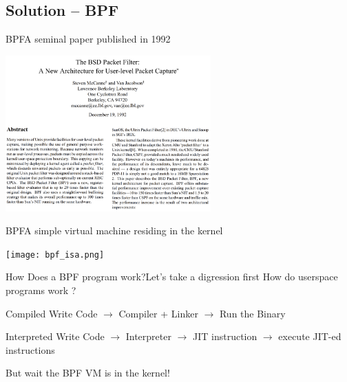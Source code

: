 \documentclass{beamer}
\begin{document}
\subsection{Solution -- BPF}
\begin{frame}{BPF}{A seminal paper published in 1992 }
\begin{center}
    \includegraphics[height=6cm]{bpf_paper.png}
\end{center}
\end{frame}

\begin{frame}{BPF}{A simple virtual machine residing in the kernel}
\begin{center}
    \texttt{[image: bpf\_isa.png]}
\end{center}
\end{frame}

\begin{frame}{How Does a BPF program work?}{Let's take a digression first}
How do userspace programs work ?

\begin{exampleblock}{Compiled}
Write Code $\rightarrow$ Compiler + Linker $\rightarrow$ Run the Binary
\end{exampleblock}

\begin{exampleblock}{Interpreted}
Write Code $\rightarrow$ Interpreter $\rightarrow$ JIT instruction $\rightarrow$ execute JIT-ed instructions
\end{exampleblock}
\hrulefill

\LARGE But wait the BPF VM is in the \alert{kernel}!


\end{frame}
\end{document}
